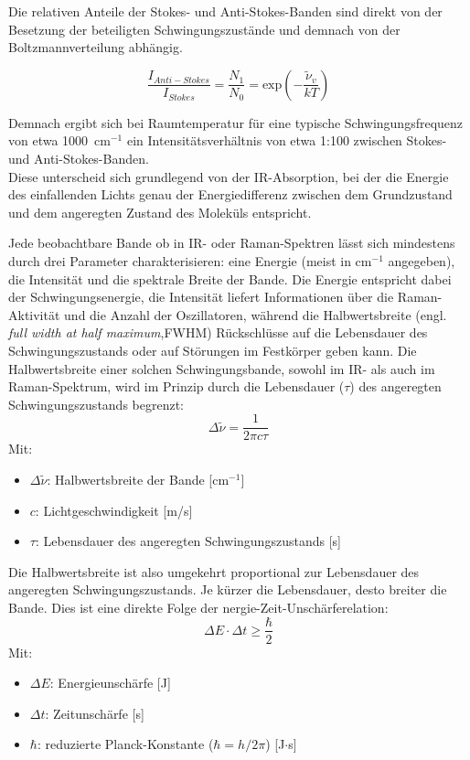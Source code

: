 Die relativen Anteile der Stokes- und Anti-Stokes-Banden sind direkt von der Besetzung der beteiligten Schwingungszustände und demnach von der Boltzmannverteilung abhängig.

\begin{equation}
    \frac{I_{Anti-Stokes}}{I_{Stokes}} = \frac{N_1}{N_0} = \text{exp}\left(-\frac{\tilde{\nu}_v}{kT}\right)
\end{equation}

Demnach ergibt sich bei Raumtemperatur für eine typische Schwingungsfrequenz von etwa 1000~cm$^{-1}$ ein Intensitätsverhältnis von etwa 1:100 zwischen Stokes- und Anti-Stokes-Banden.\\
Diese unterscheid sich grundlegend von der IR-Absorption, bei der die Energie des einfallenden Lichts genau der Energiedifferenz zwischen dem Grundzustand und dem angeregten Zustand des Moleküls entspricht.

Jede beobachtbare Bande ob in IR- oder Raman-Spektren lässt sich mindestens durch drei Parameter charakterisieren: eine Energie (meist in cm$^{-1}$ angegeben), 
die Intensität und die spektrale Breite der Bande. Die Energie entspricht dabei der Schwingungsenergie, die Intensität liefert Informationen über die Raman-Aktivität und die Anzahl der Oszillatoren, 
während die Halbwertsbreite (engl. \textit{full width at half maximum},FWHM) Rückschlüsse auf die Lebensdauer des Schwingungszustands oder auf Störungen im Festkörper geben kann. 
Die Halbwertsbreite einer solchen Schwingungsbande, sowohl im IR- als auch im Raman-Spektrum, wird im Prinzip durch die Lebensdauer ($\tau$) des angeregten Schwingungszustands begrenzt:
\begin{equation}
    \Delta\tilde{\nu} = \frac{1}{2\pi c\tau}
\end{equation}
Mit:
\begin{itemize}
    \item $\Delta\tilde{\nu}$: Halbwertsbreite der Bande [cm$^{-1}$]
    \item $c$: Lichtgeschwindigkeit [m/s]
    \item $\tau$: Lebensdauer des angeregten Schwingungszustands [s]
\end{itemize}
Die Halbwertsbreite ist also umgekehrt proportional zur Lebensdauer des angeregten Schwingungszustands. Je kürzer die Lebensdauer, desto breiter die Bande. Dies 
ist eine direkte Folge der nergie-Zeit-Unschärferelation:
\begin{equation}
    \Delta E \cdot \Delta t \geq \frac{\hbar}{2}
\end{equation}
Mit:
\begin{itemize}
    \item $\Delta E$: Energieunschärfe [J]
    \item $\Delta t$: Zeitunschärfe [s]
    \item $\hbar$: reduzierte Planck-Konstante ($\hbar = h/2\pi$) [J$\cdot$s]
\end{itemize}

